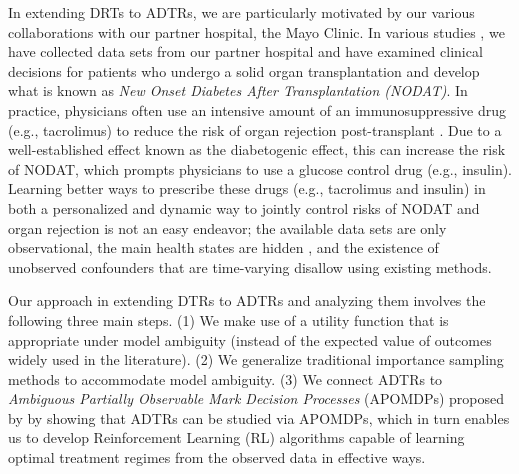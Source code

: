 \documentclass[opre,nonblindrev]{informs2}%
\newcommand{\1}{\hbox{\rm 1\kern-.35em 1}}
\begin{document}
In extending DRTs to ADTRs, we are particularly motivated by our various collaborations with our partner hospital, the Mayo Clinic.  In various studies \citep[see, e.g.,][]{Boloori2015, Boloori2020, Munshi2020b, Munshi2020,  Munshi2021}, we have collected data sets from our partner hospital and have examined clinical decisions for patients who undergo a solid organ transplantation  and develop what is known as {\em New Onset Diabetes After Transplantation (NODAT)}.  In practice, physicians often use an intensive amount of an immunosuppressive drug (e.g., tacrolimus) to reduce the risk of organ rejection post-transplant \citep[see, e.g.,][]{Boloori2015, Boloori2020}. Due to a well-established effect known as the diabetogenic effect, this can increase the risk of NODAT, which prompts physicians to use a glucose control drug (e.g., insulin). Learning better ways to prescribe these drugs (e.g., tacrolimus and insulin) in both a personalized and dynamic way  to jointly control risks of  NODAT and organ rejection is not an easy endeavor; the available data sets are only observational, the main health states are hidden \citep[see, e.g.,][]{Boloori2020}, and the existence of unobserved confounders that are time-varying disallow using existing methods.




Our approach in extending DTRs to ADTRs and analyzing them involves the following three main steps. (1) We make use of a utility function that is appropriate under model ambiguity  (instead of  the expected value of outcomes widely used in the literature). (2) We generalize traditional importance sampling methods to accommodate model ambiguity. (3) We connect ADTRs to {\em Ambiguous Partially Observable Mark Decision Processes} (APOMDPs) proposed by \cite{Saghafian2018} by showing that ADTRs can be studied via APOMDPs, which in turn enables us to develop Reinforcement Learning (RL) algorithms capable of  learning optimal treatment regimes from the observed data in effective ways.
\end{document}
